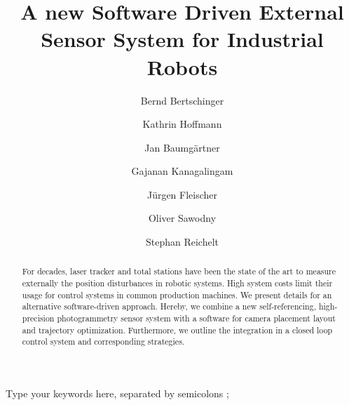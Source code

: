 \documentclass[5p,times,procedia]{elsarticle}
\begin{document}
\begin{frontmatter}
%
	\title{A new Software Driven External Sensor System for Industrial Robots}
%	
	\author[a]{Bernd Bertschinger\corref{*}}
	\author[b]{Kathrin Hoffmann}
	\author[c]{Jan Baumgärtner}
	\author[b]{Gajanan Kanagalingam}
	\author[c]{Jürgen Fleischer}
	\author[b]{Oliver Sawodny}
	\author[a]{Stephan Reichelt}
	\address[a]{Institute of Applied Optics, University of Stuttgart - ITO, Pfaffenwaldring 9, 70569 Stuttgart, Germany}
	\address[b]{Institute for System Dynamics, University of Stuttgart - ISYS, Waldburgstr. 17/19, 70563 Stuttgart, Germany}
	\address[c]{Institute of Production Science, Karlsruhe Institute of Technology - WBK, Kaiserstraße 12, 76131 Karlsruhe, Germany}
	
	\begin{abstract}
		For decades, laser tracker and total stations have been the state of the art to measure externally the position disturbances in robotic systems. High system costs limit their usage for control systems in common production machines. We present details for an alternative software-driven approach. Hereby, we combine a new self-referencing, high-precision photogrammetry sensor system with a software for camera placement layout and trajectory optimization. Furthermore, we outline the integration in a closed loop control system and corresponding strategies.
	\end{abstract}
	
	\begin{keyword}
		Type your keywords here, separated by semicolons ;
		
		
		
		
	\end{keyword}
%	
\end{frontmatter}
%
%
\end{document}
